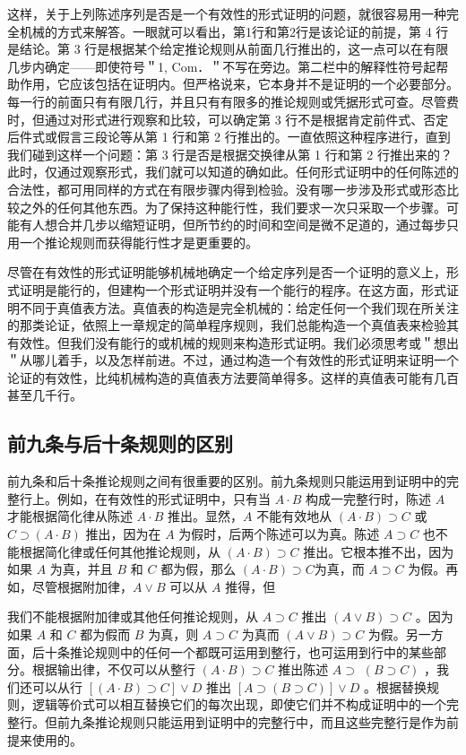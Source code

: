 这样，关于上列陈述序列是否是一个有效性的形式证明的问题，就很容易用一种完全机械的方式来解答。一眼就可以看出，第1行和第2行是该论证的前提，第 4 行是结论。第 3 行是根据某个给定推论规则从前面几行推出的，这一点可以在有限几步内确定——即使符号＂1, Com．＂不写在旁边。第二栏中的解释性符号起帮助作用，它应该包括在证明内。但严格说来，它本身并不是证明的一个必要部分。每一行的前面只有有限几行，并且只有有限多的推论规则或凭据形式可查。尽管费时，但通过对形式进行观察和比较，可以确定第 3 行不是根据肯定前件式、否定后件式或假言三段论等从第 1 行和第 2 行推出的。一直依照这种程序进行，直到我们碰到这样一个问题：第 3 行是否是根据交换律从第 1 行和第 2 行推出来的？此时，仅通过观察形式，我们就可以知道的确如此。任何形式证明中的任何陈述的合法性，都可用同样的方式在有限步骤内得到检验。没有哪一步涉及形式或形态比较之外的任何其他东西。为了保持这种能行性，我们要求一次只采取一个步骤。可能有人想合并几步以缩短证明，但所节约的时间和空间是微不足道的，通过每步只用一个推论规则而获得能行性才是更重要的。

尽管在有效性的形式证明能够机械地确定一个给定序列是否一个证明的意义上，形式证明是能行的，但建构一个形式证明并没有一个能行的程序。在这方面，形式证明不同于真值表方法。真值表的构造是完全机械的：给定任何一个我们现在所关注的那类论证，依照上一章规定的简单程序规则，我们总能构造一个真值表来检验其有效性。但我们没有能行的或机械的规则来构造形式证明。我们必须思考或＂想出＂从哪儿着手，以及怎样前进。不过，通过构造一个有效性的形式证明来证明一个论证的有效性，比纯机械构造的真值表方法要简单得多。这样的真值表可能有几百甚至几千行。

\subsection{前九条与后十条规则的区别}

前九条和后十条推论规则之间有很重要的区别。前九条规则只能运用到证明中的完整行上。例如，在有效性的形式证明中，只有当 $A \cdot B$ 构成一完整行时，陈述 $A$ 才能根据简化律从陈述 $A \cdot B$ 推出。显然，$A$ 不能有效地从 $(A \cdot B) \supset C$ 或 $C \supset(A \cdot B)$ 推出，因为在 $A$ 为假时，后两个陈述可以为真。陈述 $A \supset C$ 也不能根据简化律或任何其他推论规则，从 $(A \cdot B) \supset C$ 推出。它根本推不出，因为如果 $A$ 为真，并且 $B$ 和 $C$ 都为假，那么 $(A \cdot B) \supset C$为真，而 $A \supset C$ 为假。再如，尽管根据附加律，$A \vee B$ 可以从 $A$ 推得，但

我们不能根据附加律或其他任何推论规则，从 $A \supset C$ 推出 $(A \vee B) \supset C$ 。因为如果 $A$ 和 $C$ 都为假而 $B$ 为真，则 $A \supset C$ 为真而 $(A \vee B) \supset C$ 为假。另一方面，后十条推论规则中的任何一个都既可运用到整行，也可运用到行中的某些部分。根据输出律，不仅可以从整行 $(A \cdot B) \supset C$ 推出陈述 $A \supset$ $(B \supset C)$ ，我们还可以从行 $[(A \cdot B) \supset C] \vee D$ 推出 $[A \supset(B \supset C)] \vee D$ 。根据替换规则，逻辑等价式可以相互替换它们的每次出现，即使它们并不构成证明中的一个完整行。但前九条推论规则只能运用到证明中的完整行中，而且这些完整行是作为前提来使用的。


